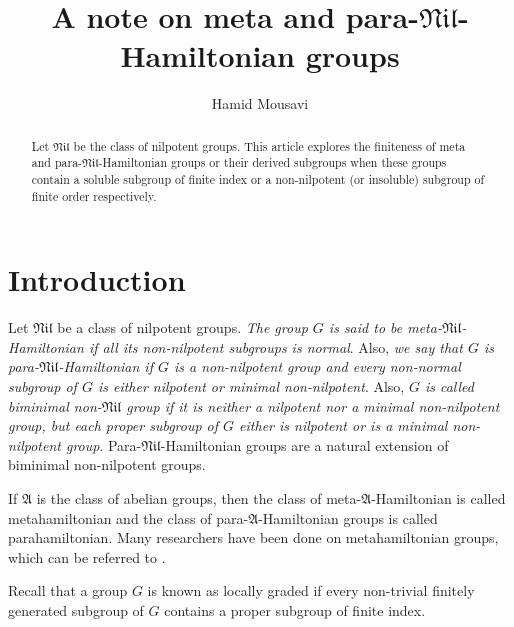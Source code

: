\documentclass[11pt]{amsart}
\newcommand{\nil}{\mathfrak{Nil}}
\begin{document}
\title[\scriptsize{A note on meta and para-$\nil$-Hamiltonian groups}]{A note on meta and para-$\nil$-Hamiltonian groups}

\author[ Hamid Mousavi]{Hamid Mousavi}

\address{{Department of Pure Mathematics, Faculty of Mathematical Sciences, University of Tabriz, Tabriz, Iran.}}


\begin{abstract}
Let $\mathfrak{Nil}$ be the class of nilpotent groups. This article explores the finiteness of meta and para-$\mathfrak{Nil}$-Hamiltonian groups or their derived subgroups when these groups contain a  soluble subgroup of finite index or a non-nilpotent (or insoluble) subgroup of finite order respectively.
\end{abstract}
\maketitle
\section{Introduction}
Let $\nil$ be a class of nilpotent groups. {\it The group $G$ is said to be meta-$\nil$-Hamiltonian if all its non-nilpotent subgroups is normal}. Also, {\it we say that $G$ is para-$\nil$-Hamiltonian if $G$ is a non-nilpotent group and every non-normal subgroup of $G$ is either nilpotent or minimal non-nilpotent}. Also, {\it $G$ is called biminimal non-$\nil$ group if it is neither a nilpotent nor a minimal non-nilpotent group, but each proper subgroup of $G$ either is nilpotent or is a minimal non-nilpotent group}. Para-$\nil$-Hamiltonian groups are a natural extension of  biminimal non-nilpotent groups.

If $\mathfrak{A}$ is the class of abelian groups, then the class of meta-$\mathfrak{A}$-Hamiltonian is called metahamiltonian and the class of para-$\mathfrak{A}$-Hamiltonian groups is called parahamiltonian. Many researchers have been done on metahamiltonian groups, which can be referred to \cite{BFT, FGM, FGM1, FangAn, RoSea1, RoSea2, RoSea3}.

Recall that a group $G$ is known as locally graded if every non-trivial finitely generated subgroup of $G$ contains a proper subgroup of finite index.
\end{document}
